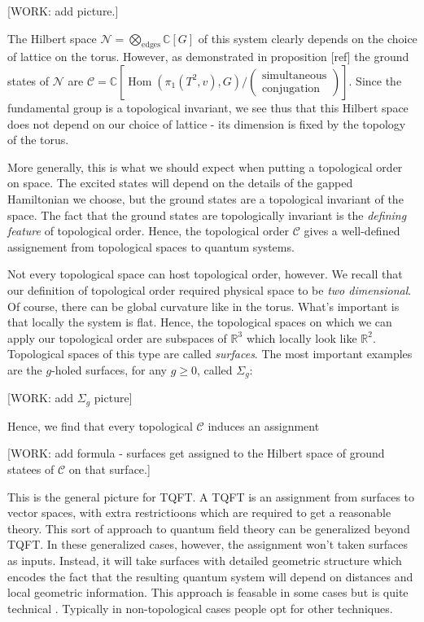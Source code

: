\documentclass{article}
\theoremstyle{definition}
\DeclareMathOperator{\Hom}{Hom}
\newcommand{\RR}{\mathbb{R}}
\newcommand{\CC}{\mathbb{C}}
\newcommand{\NN}{\mathcal{N}}
\newcommand{\Cc}{\mathcal{C}}
\newcommand{\C}{\mathscr{C}}
\newcommand{\0}{\left|0\right>}
\newcommand{\1}{\left|1\right>}
\numberwithin{figure}{section}
\begin{document}
[WORK: add picture.]

The Hilbert space $\NN=\bigotimes_{\text{edges}}\CC[G]$ of this system clearly depends on the choice of lattice on the torus. However, as demonstrated in proposition [ref] the ground states of $\NN$ are $\Cc=\CC[\Hom(\pi_1(T^2,v), G)/\left(\substack{\text{simultaneous} \\ \text{conjugation}}\right)]$. Since the fundamental group is a topological invariant, we see thus that this Hilbert space does not depend on our choice of lattice - its dimension is fixed by the topology of the torus.

More generally, this is what we should expect when putting a topological order on space. The excited states will depend on the details of the gapped Hamiltonian we choose, but the ground states are a topological invariant of the space. The fact that the ground states are topologically invariant is the \textit{defining feature} of topological order. Hence, the topological order $\C$ gives a well-defined assignement from topological spaces to quantum systems.

Not every topological space can host topological order, however. We recall that our definition of topological order required physical space to be \textit{two dimensional}. Of course, there can be global curvature like in the torus. What's important is that locally the system is flat. Hence, the topological spaces on which we can apply our topological order are subspaces of $\RR^3$ which locally look like $\RR^2$. Topological spaces of this type are called \textit{surfaces}. The most important examples are the $g$-holed surfaces, for any $g\geq 0$, called $\Sigma_g$:

[WORK: add $\Sigma_g$ picture]

Hence, we find that every topological $\C$ induces an assignment

[WORK: add formula - surfaces get assigned to the Hilbert space of ground statees of $\C$ on that surface.]

This is the general picture for TQFT. A TQFT is an assignment from surfaces to vector spaces, with extra restrictioons which are required to get a reasonable theory. This sort of approach to quantum field theory can be generalized beyond TQFT. In these generalized cases, however, the assignment won't taken surfaces as inputs. Instead, it will take surfaces with detailed geometric structure which encodes the fact that the resulting quantum system will depend on distances and local geometric information. This approach is feasable in some cases but is quite technical \cite{segal1988definition}. Typically in non-topological cases people opt for other techniques.
\end{document}
